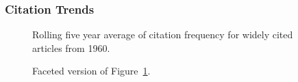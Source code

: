 \documentclass[
  10pt,
  letterpaper,
  DIV=11,
  numbers=noendperiod,
  twoside]{scrartcl}
\begin{document}
\subsubsection*{Citation Trends}\label{sec-trends-1960}

\begin{figure}


\caption{\label{fig-citation-spaghetti-1960}Rolling five year average of
citation frequency for widely cited articles from 1960.}

\end{figure}%

\begin{figure}


\caption{\label{fig-citation-facet-1960}Faceted version of
Figure~\ref{fig-citation-spaghetti-1960}.}

\end{figure}%
\end{document}
